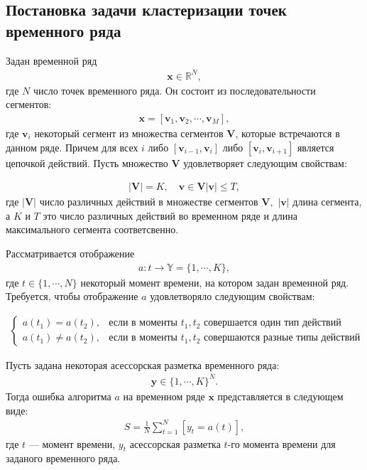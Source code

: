 \subsection{Постановка задачи кластеризации точек временного ряда}

Задан временной ряд
\[
\label{eq:st:1}
\begin{aligned}
\textbf{x} \in \mathbb{R}^{N},
\end{aligned}
\]
где $N$ число точек временного ряда. Он состоит из последовательности сегментов:
\[
\label{eq:st:2}
\begin{aligned}
\textbf{x} = [\textbf{v}_1, \textbf{v}_2, \cdots, \textbf{v}_M],
\end{aligned}
\]
где $\textbf{v}_i$ некоторый сегмент из множества сегментов $\mathbf{V}$, которые встречаются в данном ряде. 
Причем для всех $i$ либо $[\textbf{v}_{i-1},\textbf{v}_{i}]$ либо $[\textbf{v}_{i},\textbf{v}_{i+1}]$  является цепочкой действий. Пусть множество $\mathbf{V}$ удовлетворяет следующим свойствам:

\[
\label{eq:st:3}
\begin{aligned}
\left|\mathbf{V}\right| = K, \quad \textbf{v} \in \mathbf{V} \left|\textbf{v}\right| \leq T,
\end{aligned}
\]
где $\left|\mathbf{V}\right|$ число различных действий в множестве сегментов $\mathbf{V},$ $\left|\textbf{v}\right|$ длина сегмента, а $K$ и $T$ это число различных действий во временном ряде и длина максимального сегмента соответсвенно.

Рассматривается отображение
\[
\label{eq:st:4}
\begin{aligned}
a : t \to \mathbb{Y} = \{1,\cdots, K\}, 
\end{aligned}
\]
где $t \in \{1,\cdots, N\}$ некоторый момент времени, на котором задан временной ряд.
Требуется, чтобы отображение $a$ удовлетворяло следующим свойствам:

\[
\label{eq:st:5}
\begin{aligned}
\begin{cases}
    a\left(t_1\right) = a\left(t_2\right), &  \text{если в моменты } t_1, t_2 \text{ совершается один тип действий}\\
    a\left(t_1\right) \not= a\left(t_2\right), &  \text{если в моменты } t_1, t_2 \text{ совершаются разные типы действий }
\end{cases}
\end{aligned}
\]

Пусть задана некоторая асессорская разметка временного ряда:
\[
\label{eq:st:6}
\begin{aligned}
\textbf{y} \in \{1,\cdots,K\}^{N}.
\end{aligned}
\]
Тогда ошибка алгоритма $a$ на временном ряде $\textbf{x}$ представляется в следующем виде:
\[
\label{eq:st:7}
\begin{aligned}
S = \frac{1}{N}\sum_{t=1}^{N}[y_t = a\left(t\right)],
\end{aligned}
\]
где $t$ --- момент времени, $y_t$ асессорская разметка $t$-го момента времени для заданого временного ряда.


